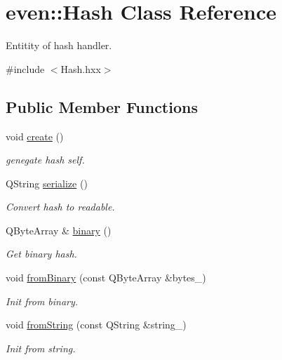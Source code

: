 \hypertarget{classeven_1_1_hash}{}\section{even\+:\+:Hash Class Reference}
\label{classeven_1_1_hash}


Entitity of hash handler.  




{\ttfamily \#include $<$Hash.\+hxx$>$}

\subsection*{Public Member Functions}
\begin{DoxyCompactItemize}
\item 
\mbox{\label{classeven_1_1_hash_a74ab0d9f1d47287dd01bcd815aa3b029}} 
void \mbox{\hyperlink{classeven_1_1_hash_a74ab0d9f1d47287dd01bcd815aa3b029}{create}} ()
\begin{DoxyCompactList}\small\item\em genegate hash self. \end{DoxyCompactList}\item 
\mbox{\label{classeven_1_1_hash_a8babc168599e8e0abc8be1ba34d4e836}} 
Q\+String \mbox{\hyperlink{classeven_1_1_hash_a8babc168599e8e0abc8be1ba34d4e836}{serialize}} ()
\begin{DoxyCompactList}\small\item\em Convert hash to readable. \end{DoxyCompactList}\item 
\mbox{\label{classeven_1_1_hash_a9049279e6fc823e4209a99561d77456d}} 
Q\+Byte\+Array \& \mbox{\hyperlink{classeven_1_1_hash_a9049279e6fc823e4209a99561d77456d}{binary}} ()
\begin{DoxyCompactList}\small\item\em Get binary hash. \end{DoxyCompactList}\item 
\mbox{\label{classeven_1_1_hash_af9de643e02cd4edf12ac39e16c45b7b4}} 
void \mbox{\hyperlink{classeven_1_1_hash_af9de643e02cd4edf12ac39e16c45b7b4}{from\+Binary}} (const Q\+Byte\+Array \&bytes\+\_\+)
\begin{DoxyCompactList}\small\item\em Init from binary. \end{DoxyCompactList}\item 
\mbox{\label{classeven_1_1_hash_a02c1f06345861204f054881746fdbd42}} 
void \mbox{\hyperlink{classeven_1_1_hash_a02c1f06345861204f054881746fdbd42}{from\+String}} (const Q\+String \&string\+\_\+)
\begin{DoxyCompactList}\small\item\em Init from string. \end{DoxyCompactList}\end{DoxyCompactItemize}
